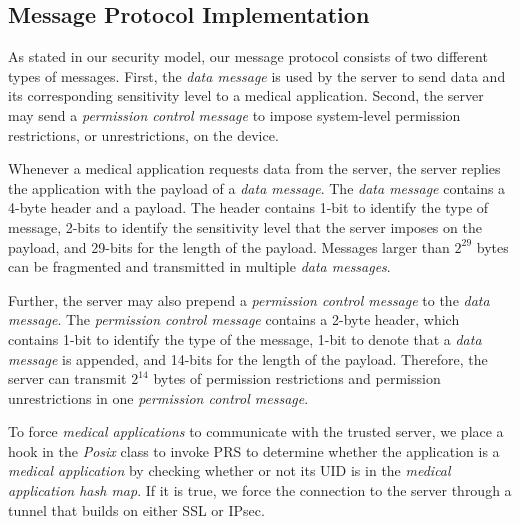 \subsection{Message Protocol Implementation} 

As stated in our security model, our message protocol consists of two different
types of messages.  First, the \textit{data message} is used by the server to
send data and its corresponding sensitivity level to a medical application.
Second, the server may send a \textit{permission control message} to impose
system-level permission restrictions, or unrestrictions, on the device.

Whenever a medical application requests data from the server, the server
replies the application with the payload of a \textit{data message}.  The
\textit{data message} contains a 4-byte header and a payload.  The header
contains 1-bit to identify the type of message, 2-bits to identify the
sensitivity level that the server imposes on the payload, and  29-bits for the
length of the payload. Messages larger than $2^{29}$ bytes can be fragmented
and transmitted in multiple \textit{data messages}.

Further, the server may also prepend a \textit{permission control message} to
the \textit{data message}.  The \textit{permission control message} contains a
2-byte header, which contains 1-bit to identify the type of the message, 1-bit
to denote that a \textit{data message} is appended, and 14-bits for the length
of the payload.  Therefore, the server can transmit $2^{14}$ bytes of
permission restrictions and permission unrestrictions in one \textit{permission
control message}.

To force \textit{medical applications} to communicate with the trusted server,
we place a hook in the \textit{Posix} class to invoke PRS to determine whether
the application is a \textit{medical application} by checking whether or not
its UID is in the \textit{medical application hash map}.  If it is true, we
force the connection to the server through a tunnel that builds on either SSL
or IPsec. 


